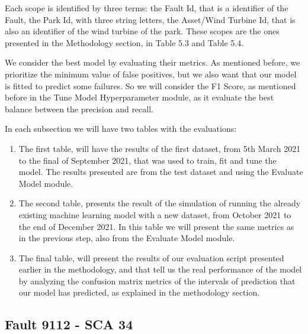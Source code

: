 Each scope is identified by three terms: the Fault Id, that is a identifier of the Fault, the Park Id, with three string letters, the Asset/Wind Turbine Id, that is also an identifier of the wind turbine of the park. These scopes are the ones presented in the Methodology section, in Table 5.3 and Table 5.4.


We consider the best model by evaluating their metrics. As mentioned before, we prioritize the minimum value of false positives, but we also want that our model is fitted to predict some failures.
So we will consider the F1 Score, as mentioned before in the Tune Model Hyperparameter module, as it evaluate the best balance between the precision and recall.

In each subsection we will have two tables with the evaluations:
\begin{enumerate}
    \item 
The first table, will have the results of the first dataset, from 5th March 2021 to the final of September 2021, that was used to train, fit and tune the model. The results presented are from the test dataset and using the Evaluate Model module.
    \item
The second table, presents the result of the simulation of running the already existing machine learning model with a new dataset, from October 2021 to the end of December 2021. In this table we will present the same metrics as in the previous step, also from the Evaluate Model module.
    \item
The final table, will present the results of our evaluation script presented earlier in the methodology, and that tell us the real performance of the model by analyzing the confusion matrix metrics of the intervals of prediction that our model has predicted, as explained in the methodology section.
\end{enumerate}



\subsection{Fault 9112 - SCA 34}

